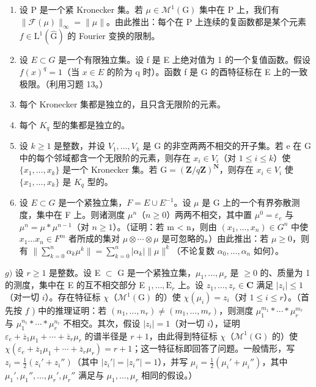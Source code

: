 \begin{enumerate}
\def\labelenumi{\alph{enumi})}
\item
  设 P 是一个紧 Kronecker 集。若 \(\mu \in \mathcal{M}^1 (\mathrm{G})\) 集中在 P 上，我们有 \(\| \mathcal{F}(\mu)\|_{\infty} = \| \mu \|\)。由此推出：每个在 P 上连续的复函数都是某个元素 \(f\in \mathrm{L}^{1}(\widehat{\mathrm{G}})\) 的 Fourier 变换的限制。
\item
  设 \(E \subset G\) 是一个有限独立集。设 f 是 E 上绝对值为 1 的一个复值函数。假设 \(f(x)^{q} = 1\)（当 \(x \in E\) 的阶为 q 时）。函数 f 是 G 的酉特征标在 E 上的一致极限。（利用习题 13。）
\item
  每个 Kronecker 集都是独立的，且只含无限阶的元素。
\item
  每个 \(K_{q}\) 型的集都是独立的。
\item
  设 \(k \geqslant 1\) 是整数，并设 \(V_{1}, \ldots, V_{k}\) 是 G 的非空两两不相交的开子集。若 e 在 G 中的每个邻域都含一个无限阶的元素，则存在 \(x_{i} \in V_{i}\)（对 \(1 \leqslant i \leqslant k\)）使 \(\{x_{1}, \ldots, x_{k}\}\) 是一个 Kronecker 集。若 \(\mathrm{G} = (\mathbf{Z}/q\mathbf{Z})^{\mathbf{N}}\)，则存在 \(x_{i} \in V_{i}\) 使 \(\{x_{1}, \ldots, x_{k}\}\) 是 \(K_{q}\) 型的。
\item
  设 \(E \subset G\) 是一个紧独立集，\(F = E \cup E^{-1}\)。设 \(\mu\) 是 G 上的一个有界弥散测度，集中在 F 上。则诸测度 \(\mu^{n}\)（\(n \geqslant 0\)）两两不相交，其中置 \(\mu^{0} = \varepsilon_{e}\) 与 \(\mu^{n} = \mu * \mu^{n-1}\)（对 \(n \geqslant 1\)）。（证明：若 m \textless{} n，则由 \((x_{1}, \ldots, x_{n}) \in G^{n}\) 中使 \(x_{1} \ldots x_{n} \in F^{m}\) 者所成的集对 \(\mu \otimes \cdots \otimes \mu\) 是可忽略的。）由此推出：若 \(\mu \geqslant 0\)，则有 \(\| \sum_{k=0}^{n} \alpha_{k} \mu^{k} \| = \sum_{k=0}^{n} |\alpha_{k}| \| \mu \|^{k}\)（不论复数 \(\alpha_{0}, \ldots, \alpha_{n}\) 如何）。
\end{enumerate}

\(g)\) 设 \(r \geqslant 1\) 是整数。设 E \(\subset\) G 是一个紧独立集，\(\mu_1, \ldots, \mu_r\) 是 \(\geqslant 0\) 的、质量为 1 的测度，集中在 E 的互不相交部分 E \(_1, \ldots, \text{E}_r\) 上。设 \(z_1, \ldots, z_r \in \mathbf{C}\) 满足 \(|z_i| \leqslant 1\)（对一切 \(i\)）。存在特征标 \(\chi\)（\(\mathcal{M}^1(\text{G})\) 的）使 \(\chi(\mu_i) = z_i\)（对 \(1 \leqslant i \leqslant r\)）。（首先按 \(f\) ) 中的推理证明：若 \((n_1, \ldots, n_r) \neq (m_1, \ldots, m_r)\)，则测度 \(\mu_1^{m_1} * \cdots * \mu_r^{m_r}\) 与 \(\mu_1^{n_1} * \cdots * \mu_r^{n_r}\) 不相交。其次，假设 \(|z_i| = 1\)（对一切 \(i\)），证明 \(\varepsilon_e + \overline{z}_1 \mu_1 + \cdots + \overline{z}_r \mu_r\) 的谱半径是 \(r+1\)，由此得到特征标 \(\chi\)（\(\mathcal{M}^1(\text{G})\) 的）使 \(\chi(\varepsilon_e + \overline{z}_1 \mu_1 + \cdots + \overline{z}_r \mu_r) = r+1\)；这一特征标即回答了问题。一般情形，写 \(z_i = \frac{1}{2}(z_i' + z_i'')\)（其中 \(|z_i'| = |z_i''| = 1\)），并写 \(\mu_i = \frac{1}{2}(\mu_i' + \mu_i'')\)，其中 \(\mu_1', \mu_1'', \ldots, \mu_r', \mu_r''\) 满足与 \(\mu_1, \ldots, \mu_r\) 相同的假设。）

